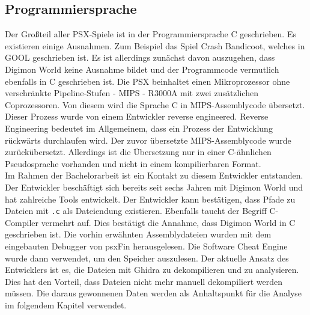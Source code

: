 \subsection{Programmiersprache}
Der Großteil aller \ac{PSX}-Spiele ist in der Programmiersprache C geschrieben\cite{retro-programming-c}. Es existieren einige Ausnahmen. Zum Beispiel das Spiel Crash Bandicoot, welches in \ac{GOOL} geschrieben ist\cite{gool}.
Es ist allerdings zunächst davon auszugehen, dass Digimon World keine Ausnahme bildet und der Programmcode vermutlich ebenfalls in C geschrieben ist. Die \ac{PSX} beinhaltet einen Mikroprozessor ohne verschränkte Pipeline-Stufen - \ac{MIPS} - R3000A mit zwei zusätzlichen Coprozessoren\cite{psx-architecture}. Von diesem wird die Sprache C in \ac{MIPS}-Assemblycode übersetzt. Dieser Prozess wurde von einem Entwickler reverse engineered. Reverse Engineering bedeutet im Allgemeinem, dass ein Prozess der Entwicklung rückwärts durchlaufen wird. Der zuvor übersetzte \ac{MIPS}-Assemblycode wurde zurückübersetzt. Allerdings ist die Übersetzung nur in einer C-ähnlichen Pseudosprache vorhanden und nicht in einem kompilierbaren Format\cite{github-dw1code}. \\

Im Rahmen der Bachelorarbeit ist ein Kontakt zu diesem Entwickler entstanden. Der Entwickler beschäftigt sich bereits seit sechs Jahren mit Digimon World und hat zahlreiche Tools entwickelt. Der Entwickler kann bestätigen, dass Pfade zu Dateien mit \texttt{.c} als Dateiendung existieren. Ebenfalls taucht der Begriff C-Compiler vermehrt auf. Dies bestätigt die Annahme, dass Digimon World in C geschrieben ist. Die vorhin erwähnten Assemblydateien wurden mit dem eingebauten Debugger von psxFin herausgelesen\cite{psxfin}. Die Software Cheat Engine wurde dann verwendet, um den Speicher auszulesen\cite{cheatengine}. Der aktuelle Ansatz des Entwicklers ist es, die Dateien mit Ghidra zu dekompilieren und zu analysieren\cite{ghidra}. Dies hat den Vorteil, dass Dateien nicht mehr manuell dekompiliert werden müssen. Die daraus gewonnenen Daten werden als Anhaltspunkt für die Analyse im folgendem Kapitel verwendet.\\

